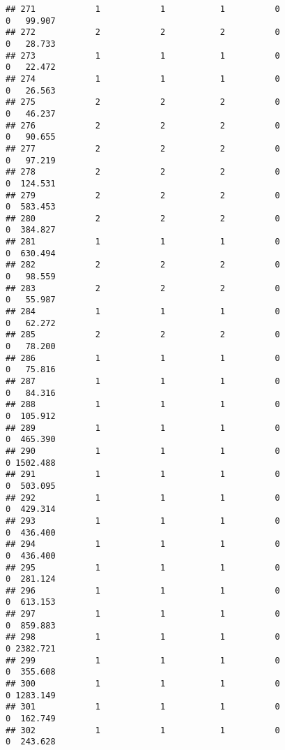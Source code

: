 \documentclass[
]{article}
\begin{document}
\begin{verbatim}
## 271            1            1           1          0                0   99.907
## 272            2            2           2          0                0   28.733
## 273            1            1           1          0                0   22.472
## 274            1            1           1          0                0   26.563
## 275            2            2           2          0                0   46.237
## 276            2            2           2          0                0   90.655
## 277            2            2           2          0                0   97.219
## 278            2            2           2          0                0  124.531
## 279            2            2           2          0                0  583.453
## 280            2            2           2          0                0  384.827
## 281            1            1           1          0                0  630.494
## 282            2            2           2          0                0   98.559
## 283            2            2           2          0                0   55.987
## 284            1            1           1          0                0   62.272
## 285            2            2           2          0                0   78.200
## 286            1            1           1          0                0   75.816
## 287            1            1           1          0                0   84.316
## 288            1            1           1          0                0  105.912
## 289            1            1           1          0                0  465.390
## 290            1            1           1          0                0 1502.488
## 291            1            1           1          0                0  503.095
## 292            1            1           1          0                0  429.314
## 293            1            1           1          0                0  436.400
## 294            1            1           1          0                0  436.400
## 295            1            1           1          0                0  281.124
## 296            1            1           1          0                0  613.153
## 297            1            1           1          0                0  859.883
## 298            1            1           1          0                0 2382.721
## 299            1            1           1          0                0  355.608
## 300            1            1           1          0                0 1283.149
## 301            1            1           1          0                0  162.749
## 302            1            1           1          0                0  243.628

\end{verbatim}
\end{document}
